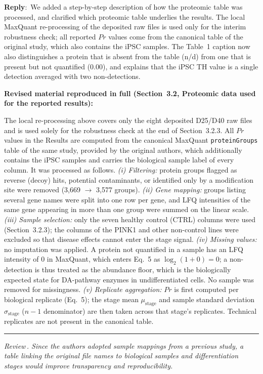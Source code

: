 \documentclass[11pt]{article}
\newcounter{reviewer}
\newcounter{point}[reviewer]
\renewcommand{\thepoint}{Review\,\thereviewer.\arabic{point}}
\newcommand{\point}[1]{\refstepcounter{point}  \bigskip \hrule \medskip \noindent \textit{{\fontseries{b}\selectfont \thepoint } #1}\par}
\newcommand{\reply}{\medskip \noindent \textbf{Reply}:\ }
\newcommand{\revisedheading}[1]{\medskip\noindent\textbf{Revised material
  reproduced in full (#1):}\par}
\newenvironment{revised}{\par\color{red}}{\par}
\begin{document}
\reply{We added a step-by-step description of how the proteomic table was processed, and clarified which proteomic table underlies the results. The local MaxQuant re-processing of the deposited raw files is used only for the interim robustness check; all reported $Pr$ values come from the canonical table of the original study, which also contains the iPSC samples. The Table~1 caption now also distinguishes a protein that is absent from the table (n/d) from one that is present but not quantified (0.00), and explains that the iPSC TH value is a single detection averaged with two non-detections.}

\revisedheading{Section~3.2, Proteomic data used for the reported results}
\begin{revised}
The local re-processing above covers only the eight deposited D25/D40 raw files and is used solely for the robustness check at the end of Section~3.2.3. All $Pr$ values in the Results are computed from the canonical MaxQuant \texttt{proteinGroups} table of the same study, provided by the original authors, which additionally contains the iPSC samples and carries the biological sample label of every column. It was processed as follows. \textit{(i) Filtering:} protein groups flagged as reverse (decoy) hits, potential contaminants, or identified only by a modification site were removed (3,669 $\to$ 3,577 groups). \textit{(ii) Gene mapping:} groups listing several gene names were split into one row per gene, and LFQ intensities of the same gene appearing in more than one group were summed on the linear scale. \textit{(iii) Sample selection:} only the seven healthy control (CTRL) columns were used (Section~3.2.3); the columns of the PINK1 and other non-control lines were excluded so that disease effects cannot enter the stage signal. \textit{(iv) Missing values:} no imputation was applied. A protein not quantified in a sample has an LFQ intensity of 0 in MaxQuant, which enters Eq.~5 as $\log_{2}(1+0) = 0$; a non-detection is thus treated as the abundance floor, which is the biologically expected state for DA-pathway enzymes in undifferentiated cells. No sample was removed for missingness. \textit{(v) Replicate aggregation:} $Pr$ is first computed per biological replicate (Eq.~5); the stage mean $\mu_{\text{stage}}$ and sample standard deviation $\sigma_{\text{stage}}$ ($n-1$ denominator) are then taken across that stage's replicates. Technical replicates are not present in the canonical table.
\end{revised}

\point{Since the authors adopted sample mappings from a previous study, a table linking the original file names to biological samples and differentiation stages would improve transparency and reproducibility.}
\end{document}
